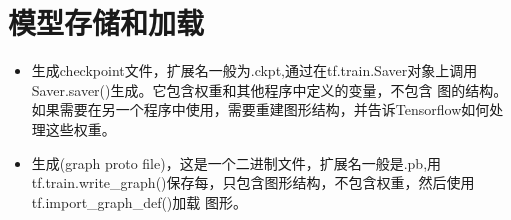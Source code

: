 \section{模型存储和加载}
\begin{itemize}
\item 生成checkpoint文件，扩展名一般为.ckpt,通过在tf.train.Saver对象上调用Saver.saver()生成。它包含权重和其他程序中定义的变量，不包含
图的结构。如果需要在另一个程序中使用，需要重建图形结构，并告诉Tensorflow如何处理这些权重。
\item 生成(graph proto file)，这是一个二进制文件，扩展名一般是.pb,用tf.train.write\_graph()保存每，只包含图形结构，不包含权重，然后使用tf.import\_graph\_def()加载
图形。
\end{itemize}

